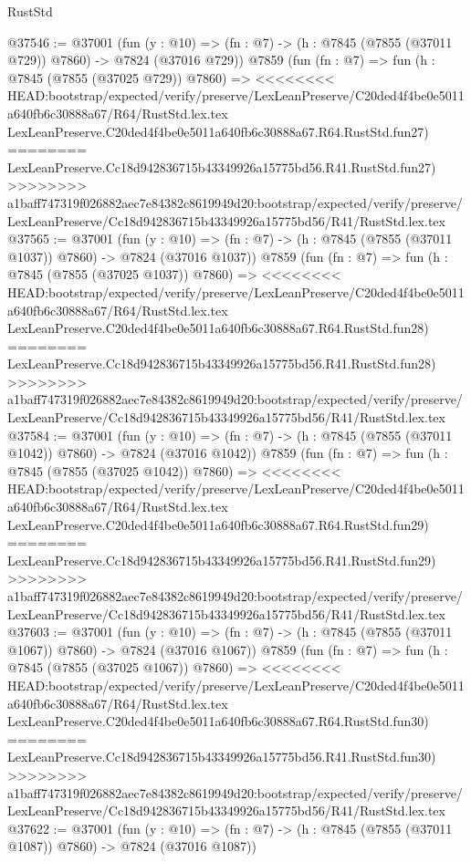 \begin{lexlean}{RustStd}
\begin{coremodule}
{\begin{coremodule}
{{{{{{{{{{{{{{{{{{{{{{{{{{{{{{{{{{{{{{{{{{{{{{{{{{{{{{@37546 := @37001
    (fun (y : @10) => (fn : @7) -> (h : @7845 (@7855 (@37011 @729)) @7860) -> @7824 (@37016 @729))
    @7859
    (fun (fn : @7) =>
    fun (h : @7845 (@7855 (@37025 @729)) @7860) =>
<<<<<<<< HEAD:bootstrap/expected/verify/preserve/LexLeanPreserve/C20ded4f4be0e5011a640fb6c30888a67/R64/RustStd.lex.tex
    LexLeanPreserve.C20ded4f4be0e5011a640fb6c30888a67.R64.RustStd.fun27)
========
    LexLeanPreserve.Cc18d942836715b43349926a15775bd56.R41.RustStd.fun27)
>>>>>>>> a1baff747319f026882aec7e84382c8619949d20:bootstrap/expected/verify/preserve/LexLeanPreserve/Cc18d942836715b43349926a15775bd56/R41/RustStd.lex.tex
@37565 := @37001
    (fun (y : @10) => (fn : @7) -> (h : @7845 (@7855 (@37011 @1037)) @7860) -> @7824 (@37016 @1037))
    @7859
    (fun (fn : @7) =>
    fun (h : @7845 (@7855 (@37025 @1037)) @7860) =>
<<<<<<<< HEAD:bootstrap/expected/verify/preserve/LexLeanPreserve/C20ded4f4be0e5011a640fb6c30888a67/R64/RustStd.lex.tex
    LexLeanPreserve.C20ded4f4be0e5011a640fb6c30888a67.R64.RustStd.fun28)
========
    LexLeanPreserve.Cc18d942836715b43349926a15775bd56.R41.RustStd.fun28)
>>>>>>>> a1baff747319f026882aec7e84382c8619949d20:bootstrap/expected/verify/preserve/LexLeanPreserve/Cc18d942836715b43349926a15775bd56/R41/RustStd.lex.tex
@37584 := @37001
    (fun (y : @10) => (fn : @7) -> (h : @7845 (@7855 (@37011 @1042)) @7860) -> @7824 (@37016 @1042))
    @7859
    (fun (fn : @7) =>
    fun (h : @7845 (@7855 (@37025 @1042)) @7860) =>
<<<<<<<< HEAD:bootstrap/expected/verify/preserve/LexLeanPreserve/C20ded4f4be0e5011a640fb6c30888a67/R64/RustStd.lex.tex
    LexLeanPreserve.C20ded4f4be0e5011a640fb6c30888a67.R64.RustStd.fun29)
========
    LexLeanPreserve.Cc18d942836715b43349926a15775bd56.R41.RustStd.fun29)
>>>>>>>> a1baff747319f026882aec7e84382c8619949d20:bootstrap/expected/verify/preserve/LexLeanPreserve/Cc18d942836715b43349926a15775bd56/R41/RustStd.lex.tex
@37603 := @37001
    (fun (y : @10) => (fn : @7) -> (h : @7845 (@7855 (@37011 @1067)) @7860) -> @7824 (@37016 @1067))
    @7859
    (fun (fn : @7) =>
    fun (h : @7845 (@7855 (@37025 @1067)) @7860) =>
<<<<<<<< HEAD:bootstrap/expected/verify/preserve/LexLeanPreserve/C20ded4f4be0e5011a640fb6c30888a67/R64/RustStd.lex.tex
    LexLeanPreserve.C20ded4f4be0e5011a640fb6c30888a67.R64.RustStd.fun30)
========
    LexLeanPreserve.Cc18d942836715b43349926a15775bd56.R41.RustStd.fun30)
>>>>>>>> a1baff747319f026882aec7e84382c8619949d20:bootstrap/expected/verify/preserve/LexLeanPreserve/Cc18d942836715b43349926a15775bd56/R41/RustStd.lex.tex
@37622 := @37001
    (fun (y : @10) => (fn : @7) -> (h : @7845 (@7855 (@37011 @1087)) @7860) -> @7824 (@37016 @1087))
}}}}}}}}}}}}}}}}}}}}}}}}}}}}}}}}}}}}}}}}}}}}}}}}}}}}}}
\end{coremodule}}
\end{coremodule}
\end{lexlean}
